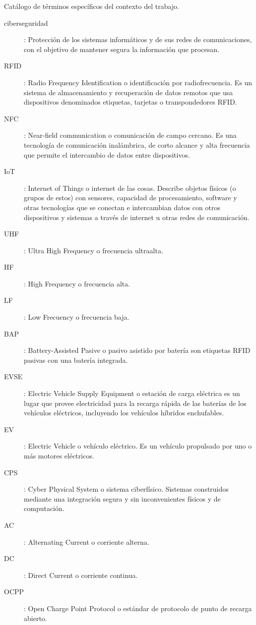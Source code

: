 \documentclass[12pt,a4paper,onecolumn,oneside]{report}
\begin{document}
Catálogo de términos específicos del contexto del trabajo.


\begin{description}
	
	\item[ciberseguridad]: Protección de los sistemas informáticos y de sus redes de comunicaciones, con el objetivo de mantener segura la información que procesan.	
	\item[RFID]: Radio Frequency Identification o identificación por radiofrecuencia. Es un sistema de almacenamiento y recuperación de datos remotos que usa dispositivos denominados etiquetas, tarjetas o transpondedores RFID.
	\item[NFC]: Near-field communication o comunicación de campo cercano. Es una tecnología de comunicación inalámbrica, de corto alcance y alta frecuencia que permite el intercambio de datos entre dispositivos.
	\item[IoT]: Internet of Things o internet de las cosas. Describe objetos físicos (o grupos de estos) con sensores, capacidad de procesamiento, software y otras tecnologías que se conectan e intercambian datos con otros dispositivos y sistemas a través de internet u otras redes de comunicación.
	\item[UHF]: Ultra High Frequency o frecuencia ultraalta.
	\item[HF]: High Frequency o frecuencia alta.
	\item[LF]: Low Frecuency o frecuencia baja.
	\item[BAP]: Battery-Assisted Pasive o pasivo asistido por batería son etiquetas RFID pasivas con una batería integrada.
	\item[EVSE]: Electric Vehicle Supply Equipment o estación de carga eléctrica es un lugar que provee electricidad para la recarga rápida de las baterías de los vehículos eléctricos, incluyendo los vehículos híbridos enchufables.
	\item[EV]: Electric Vehicle o vehículo eléctrico. Es un vehículo propulsado por uno o más motores eléctricos.
	\item[CPS]: Cyber Physical System o sistema ciberfísico. Sistemas construidos mediante una integración segura y sin inconvenientes físicos y de computación.
	\item[AC]: Alternating Current o corriente alterna.
	\item[DC]: Direct Current o corriente continua.
	\item[OCPP]: Open Charge Point Protocol o estándar de protocolo de punto de recarga abierto.

\end{description}
\end{document}
